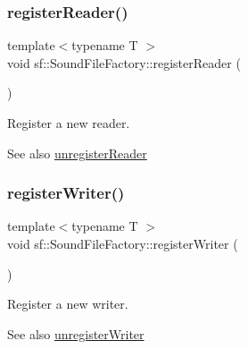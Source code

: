 \subsubsection{\texorpdfstring{register\+Reader()}{registerReader()}}
{\footnotesize\ttfamily template$<$typename T $>$ \\
void sf\+::\+Sound\+File\+Factory\+::register\+Reader (\begin{DoxyParamCaption}{ }\end{DoxyParamCaption})\hspace{0.3cm}{\ttfamily [static]}}



Register a new reader. 

\begin{DoxySeeAlso}{See also}
\hyperlink{classsf_1_1_sound_file_factory_a9e6765c41e2784bc755388afb4a2f432}{unregister\+Reader} 
\end{DoxySeeAlso}
\mbox{\label{classsf_1_1_sound_file_factory_a3a59140e6ccf1f252f721b790eddd661}} 
\subsubsection{\texorpdfstring{register\+Writer()}{registerWriter()}}
{\footnotesize\ttfamily template$<$typename T $>$ \\
void sf\+::\+Sound\+File\+Factory\+::register\+Writer (\begin{DoxyParamCaption}{ }\end{DoxyParamCaption})\hspace{0.3cm}{\ttfamily [static]}}



Register a new writer. 

\begin{DoxySeeAlso}{See also}
\hyperlink{classsf_1_1_sound_file_factory_a2306f90d1f72e474732e4bcceeb34215}{unregister\+Writer} 
\end{DoxySeeAlso}
\mbox{\label{classsf_1_1_sound_file_factory_a9e6765c41e2784bc755388afb4a2f432}} 
